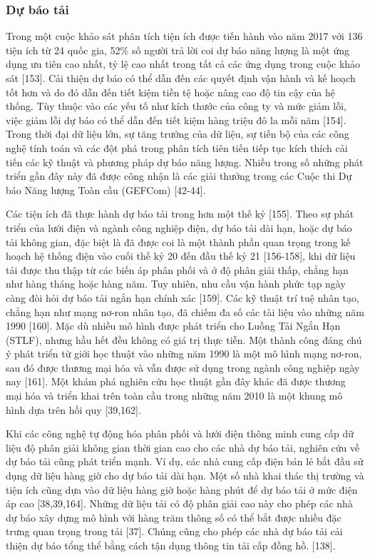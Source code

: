 \documentclass[utf8]{frontiersSCNS} %
\begin{document}
\subsubsection{Dự báo tải}
Trong một cuộc khảo sát phân tích tiện ích được tiến hành vào năm 2017 với 136 tiện ích từ 24 quốc gia, 52\% số người trả lời coi dự báo năng lượng là một ứng dụng ưu tiên cao nhất, tỷ lệ cao nhất trong tất cả các ứng dụng trong cuộc khảo sát [153]. Cải thiện dự báo có thể dẫn đến các quyết định vận hành và kế hoạch tốt hơn và do đó dẫn đến tiết kiệm tiền tệ hoặc nâng cao độ tin cậy của hệ thống. Tùy thuộc vào các yếu tố như kích thước của công ty và mức giảm lỗi, việc giảm lỗi dự báo có thể dẫn đến tiết kiệm hàng triệu đô la mỗi năm [154]. Trong thời đại dữ liệu lớn, sự tăng trưởng của dữ liệu, sự tiến bộ của các công nghệ tính toán và các đột phá trong phân tích tiên tiến tiếp tục kích thích cải tiến các kỹ thuật và phương pháp dự báo năng lượng. Nhiều trong số những phát triển gần đây này đã được công nhận là các giải thưởng trong các Cuộc thi Dự báo Năng lượng Toàn cầu (GEFCom) [42-44].

Các tiện ích đã thực hành dự báo tải trong hơn một thế kỷ [155]. Theo sự phát triển của lưới điện và ngành công nghiệp điện, dự báo tải dài hạn, hoặc dự báo tải không gian, đặc biệt là đã được coi là một thành phần quan trọng trong kế hoạch hệ thống điện vào cuối thế kỷ 20 đến đầu thế kỷ 21 [156-158], khi dữ liệu tải được thu thập từ các biến áp phân phối và ở độ phân giải thấp, chẳng hạn như hàng tháng hoặc hàng năm. Tuy nhiên, nhu cầu vận hành phức tạp ngày càng đòi hỏi dự báo tải ngắn hạn chính xác [159]. Các kỹ thuật trí tuệ nhân tạo, chẳng hạn như mạng nơ-ron nhân tạo, đã chiếm đa số các tài liệu vào những năm 1990 [160]. Mặc dù nhiều mô hình được phát triển cho Luồng Tải Ngắn Hạn (STLF), nhưng hầu hết đều không có giá trị thực tiễn. Một thành công đáng chú ý phát triển từ giới học thuật vào những năm 1990 là một mô hình mạng nơ-ron, sau đó được thương mại hóa và vẫn được sử dụng trong ngành công nghiệp ngày nay [161]. Một khám phá nghiên cứu học thuật gần đây khác đã được thương mại hóa và triển khai trên toàn cầu trong những năm 2010 là một khung mô hình dựa trên hồi quy [39,162].

Khi các công nghệ tự động hóa phân phối và lưới điện thông minh cung cấp dữ liệu độ phân giải không gian thời gian cao cho các nhà dự báo tải, nghiên cứu về dự báo tải cũng phát triển mạnh. Ví dụ, các nhà cung cấp điện bán lẻ bắt đầu sử dụng dữ liệu hàng giờ cho dự báo tải dài hạn. Một số nhà khai thác thị trường và tiện ích cũng dựa vào dữ liệu hàng giờ hoặc hàng phút để dự báo tải ở mức điện áp cao [38,39,164]. Những dữ liệu tải có độ phân giải cao này cho phép các nhà dự báo xây dựng mô hình với hàng trăm thông số có thể bắt được nhiều đặc trưng quan trọng trong tải [37]. Chúng cũng cho phép các nhà dự báo tải cải thiện dự báo tổng thể bằng cách tận dụng thông tin tải cấp đồng hồ. [138].
\end{document}
